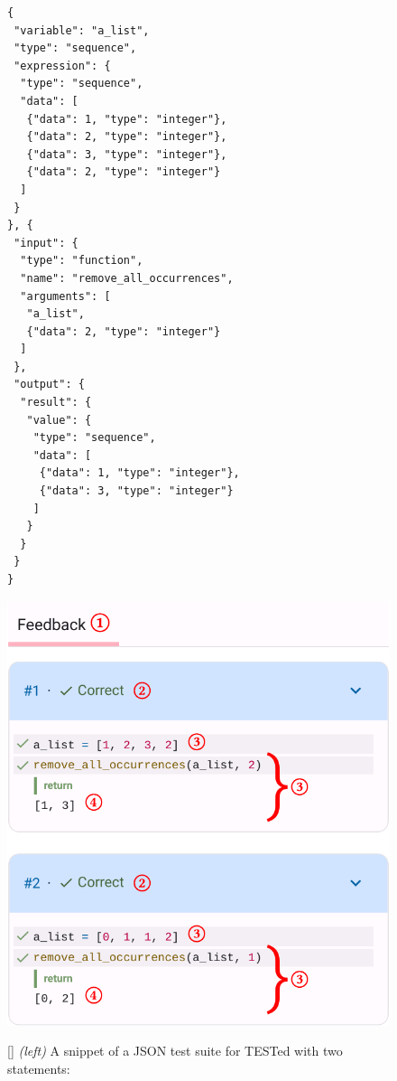 \documentclass[../main]{subfiles}
\begin{document}
\begin{figure}
    \begin{wide}
        \begin{minipage}{0.49\linewidth}
            \begin{verbatim}
{
 "variable": "a_list",
 "type": "sequence",
 "expression": {
  "type": "sequence",
  "data": [
   {"data": 1, "type": "integer"},
   {"data": 2, "type": "integer"},
   {"data": 3, "type": "integer"},
   {"data": 2, "type": "integer"}
  ]
 }
}, {
 "input": {
  "type": "function",
  "name": "remove_all_occurrences",
  "arguments": [
   "a_list",
   {"data": 2, "type": "integer"}
  ]
 },
 "output": {
  "result": {
   "value": {
    "type": "sequence",
    "data": [
     {"data": 1, "type": "integer"},
     {"data": 3, "type": "integer"}
    ]
   }
  }
 }
}
            \end{verbatim}
        \end{minipage}
        \begin{minipage}{0.49\linewidth}
            \includegraphics[width=\textwidth]{dodona-rendering}
        \end{minipage}
    \end{wide}
    []{
        \textit{(left)} A snippet of a JSON test suite for TESTed with two statements:
}
\end{figure}
\end{document}
